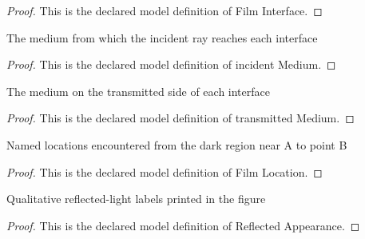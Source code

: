 \begin{proof}
  This is the declared model definition of Film Interface.
\end{proof}
\begin{definition}
  \label{def:physics:phyx-mini-0151:phyxminiproblems-problemphyxmini0151-filminterface-incidentmedium}
  The medium from which the incident ray reaches each interface
\end{definition}
\begin{proof}
  This is the declared model definition of incident Medium.
\end{proof}
\begin{definition}
  \label{def:physics:phyx-mini-0151:phyxminiproblems-problemphyxmini0151-filminterface-transmittedmedium}
  The medium on the transmitted side of each interface
\end{definition}
\begin{proof}
  This is the declared model definition of transmitted Medium.
\end{proof}
\begin{definition}
  \label{def:physics:phyx-mini-0151:phyxminiproblems-problemphyxmini0151-filmlocation}
  Named locations encountered from the dark region near A to point B
\end{definition}
\begin{proof}
  This is the declared model definition of Film Location.
\end{proof}
\begin{definition}
  \label{def:physics:phyx-mini-0151:phyxminiproblems-problemphyxmini0151-reflectedappearance}
  Qualitative reflected-light labels printed in the figure
\end{definition}
\begin{proof}
  This is the declared model definition of Reflected Appearance.
\end{proof}

